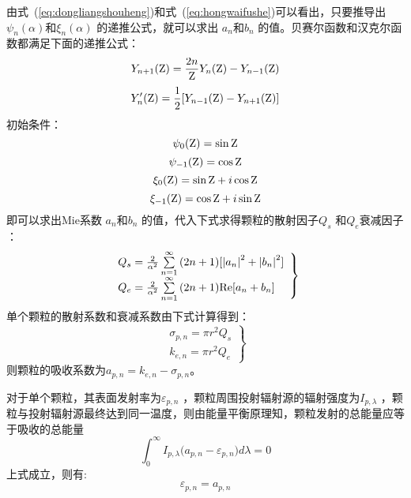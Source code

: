 由式~(\ref{eq:dongliangshouheng})和式~(\ref{eq:hongwaifushe})可以看出，只要推导出 $\psi_n(\alpha)$和$\xi_n(\alpha)$ 的递推公式，就可以求出 $a_n$和$b_n$ 的值。贝赛尔函数和汉克尔函数都满足下面的递推公式：
\begin{equation}
{Y_{n + 1}}({\rm Z}) = \frac{{2n}}{{\rm Z}}{Y_n}({\rm Z}) - {Y_{n - 1}}({\rm Z})
\end{equation}
\begin{equation}
{Y'_n}({\rm Z}) = \frac{1}{2}[{Y_{n - 1}}({\rm Z}) - {Y_{n + 1}}({\rm Z})]
\end{equation}
初始条件：
\begin{equation}
{\psi _0}({\rm Z}) = \sin {\rm Z}
\end{equation}
\begin{equation}
{\psi _{ - 1}}({\rm Z}) = \cos {\rm Z}
\end{equation}
\begin{equation}
{\xi _0}({\rm Z}) = \sin {\rm Z} + i\cos {\rm Z}
\end{equation}
\begin{equation}
{\xi _{ - 1}}({\rm Z}) = \cos {\rm Z} + i\sin {\rm Z}
\end{equation}
即可以求出Mie系数 $a_n$和$b_n$  的值，代入下式求得颗粒的散射因子$Q_s$ 和$Q_e$衰减因子 ：
\begin{equation}
\left. \begin{array}{l}
{Q_s} = \frac{2}{{{\alpha ^2}}}\sum\limits_{n = 1}^\infty  {(2n + 1)[{{\left| {{a_n}} \right|}^2} + {{\left| {{b_n}} \right|}^2}]} \\
{Q_e} = \frac{2}{{{\alpha ^2}}}\sum\limits_{n = 1}^\infty  {(2n + 1){\mathop{\rm Re}\nolimits} [{a_n} + {b_n}]} 
\end{array} \right\}
\end{equation}
单个颗粒的散射系数和衰减系数由下式计算得到：
\begin{equation}
\left. \begin{array}{l}
{\sigma _{p,n}} = \pi {r^2}{Q_s}\\
{k_{e,n}} = \pi {r^2}{Q_e}
\end{array} \right\}
\end{equation}
则颗粒的吸收系数为$a_{p,n}=k_{e,n} -\sigma_{p,n}$。

对于单个颗粒，其表面发射率为$\varepsilon_{p,n}$ ，颗粒周围投射辐射源的辐射强度为$I_{p,\lambda}$ ，颗粒与投射辐射源最终达到同一温度，则由能量平衡原理知，颗粒发射的总能量应等于吸收的总能量
\begin{equation}
\int_0^\infty  {{I_{p,\lambda }}({a_{p,n}} - } {\varepsilon _{p,n}})d\lambda  = 0
\end{equation}
上式成立，则有:
\begin{equation}
{\varepsilon _{p,n}} = {a_{p,n}}
\end{equation}
